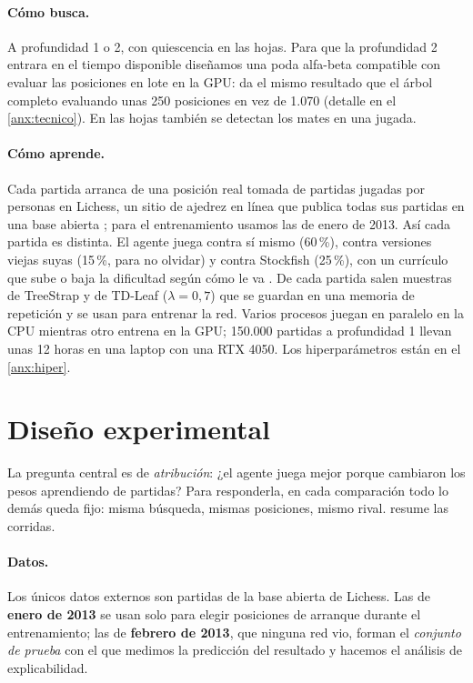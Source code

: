 \documentclass[11pt,a4paper]{article}
\begin{document}
\paragraph{Cómo busca.} A profundidad 1 o 2, con quiescencia en las hojas.
Para que la profundidad 2 entrara en el tiempo disponible diseñamos una
poda alfa-beta compatible con evaluar las posiciones en lote en la GPU:
da el mismo resultado que el árbol completo evaluando unas 250 posiciones
en vez de 1.070 (detalle en el \cref{anx:tecnico}). En las hojas también se
detectan los mates en una jugada.

\paragraph{Cómo aprende.} Cada partida arranca de una posición real
tomada de partidas jugadas por personas en Lichess, un sitio de ajedrez en
línea que publica todas sus partidas en una base abierta \citep{lichess};
para el entrenamiento usamos las de enero de 2013. Así cada partida es
distinta. El agente juega contra sí
mismo (60\,\%), contra versiones viejas suyas (15\,\%, para no olvidar) y
contra Stockfish \citep{stockfish} (25\,\%), con un currículo que sube o baja
la dificultad según cómo le va \citep{bengio2009}. De cada partida salen
muestras de TreeStrap y de TD-Leaf ($\lambda=0,7$) que se guardan en una
memoria de repetición \citep{lin1992} y se usan para entrenar la red.
Varios procesos juegan en paralelo en la CPU mientras otro entrena en la
GPU; 150.000 partidas a profundidad 1 llevan unas 12 horas en una laptop con
una RTX 4050. Los hiperparámetros están en el \cref{anx:hiper}.

\section{Diseño experimental}

La pregunta central es de \emph{atribución}: ¿el agente juega mejor porque
cambiaron los pesos aprendiendo de partidas? Para responderla, en cada
comparación todo lo demás queda fijo: misma búsqueda, mismas posiciones,
mismo rival.  resume las corridas.

\paragraph{Datos.} Los únicos datos externos son partidas de la base abierta
de Lichess. Las de \textbf{enero de 2013} se usan solo para elegir posiciones
de arranque durante el entrenamiento; las de \textbf{febrero de 2013}, que
ninguna red vio, forman el \emph{conjunto de prueba} con el que medimos la
predicción del resultado y hacemos el análisis de explicabilidad.
\end{document}

